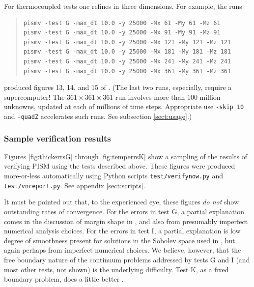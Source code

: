 \documentclass[11pt,final]{amsart}
\begin{document}
For thermocoupled tests one refines in three dimensions.  For example, the runs
\begin{quote}\small
\begin{verbatim}
pismv -test G -max_dt 10.0 -y 25000 -Mx 61 -My 61 -Mz 61
pismv -test G -max_dt 10.0 -y 25000 -Mx 91 -My 91 -Mz 91
pismv -test G -max_dt 10.0 -y 25000 -Mx 121 -My 121 -Mz 121
pismv -test G -max_dt 10.0 -y 25000 -Mx 181 -My 181 -Mz 181
pismv -test G -max_dt 10.0 -y 25000 -Mx 241 -My 241 -Mz 241
pismv -test G -max_dt 10.0 -y 25000 -Mx 361 -My 361 -Mz 361
\end{verbatim}
\normalsize\end{quote}
produced figures 13, 14, and 15 of \cite{BBL}.  (The last two runs, especially, require a supercomputer!  The $361\times 361\times 361$ run involves more than $100$ million unknowns, updated at each of millions of time steps.  Appropriate use \verb|-skip 10| and \verb|-quadZ| accelerates such runs.  See subsection \ref{sect:usage}.)

\subsubsection*{Sample verification results}  Figures \ref{fig:thickerrsG} through \ref{fig:temperrsK} show a sampling of the results of verifying PISM using the tests described above.  These figures were produced more-or-less automatically using Python scripts \verb|test/verifynow.py| and \verb|test/vnreport.py|.  See appendix \ref{sect:scripts}.

It must be pointed out that, to the experienced eye, these figures \emph{do not} show outstanding rates of convergence.  For the errors in test G, a partial explanation comes in the discussion of margin shape in \cite{BLKCB}, and also from presumably imperfect numerical analysis choices.  For the errors in test I, a partial explanation is low degree of smoothness present for solutions in the Sobolev space used in \cite{SchoofStream}, but again perhaps from imperfect numerical choices.  We believe, however, that the free boundary nature of the continuum problems addressed by tests G and I (and most other tests, not shown) is the underlying difficulty.  Test K, as a fixed boundary problem, does a little better \cite{BuelerTestK}.
\end{document}
